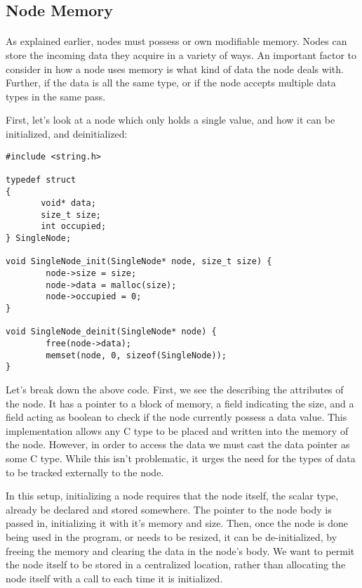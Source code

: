 \subsection{Node Memory}

\paragraph{  }As explained earlier, nodes must possess or own modifiable memory. Nodes can store the incoming data they acquire in a variety of ways. An important factor to consider in how a node uses memory is what kind of data the node deals with. Further, if the data is all the same type, or if the node accepts multiple data types in the same pass.
\par First, let's look at a node which only holds a single value, and how it can be initialized, and deinitialized: \\

\begin{lstlisting}[style=numc]
#include <string.h>

typedef struct 
{
       void* data;
       size_t size;
       int occupied;
} SingleNode;

void SingleNode_init(SingleNode* node, size_t size) {
        node->size = size;
        node->data = malloc(size);
        node->occupied = 0;
}

void SingleNode_deinit(SingleNode* node) {
        free(node->data);
        memset(node, 0, sizeof(SingleNode));
}
\end{lstlisting}

\par Let's break down the above code. First, we see the  describing the attributes of the node. It has a  pointer to a block of memory, a field indicating the size, and a field acting as boolean to check if the node currently possess a data value. This implementation allows any C type to be placed and written into the memory of the node. However, in order to access the data we must cast the data pointer as some C type. While this isn't problematic, it urges the need for the types of data to be tracked externally to the node.

\par In this setup, initializing a node requires that the node itself, the scalar type, already be declared and stored somewhere. The pointer to the node body is passed in, initializing it with it's memory and size. Then, once the node is done being used in the program, or needs to be resized, it can be de-initialized, by freeing the memory and clearing the data in the node's body. We want to permit the node itself to be stored in a centralized location, rather than allocating the node itself with a call to  each time it is initialized.


